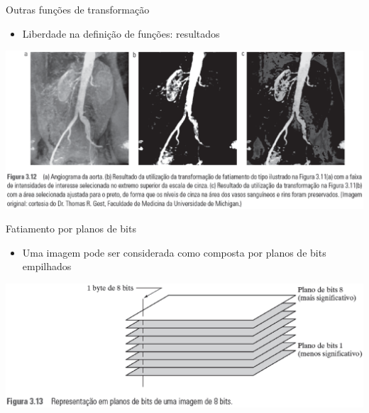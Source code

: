    \begin{slide}[toc=]{Outras funções de transformação}
      \begin{itemize}
         \item Liberdade na definição de funções: resultados
      \end{itemize}
         \begin{center}
             \includegraphics[width=\textwidth]{figs/fig0312}
         \end{center}
    \end{slide}

   \begin{slide}[toc=]{Fatiamento por planos de bits}
      \begin{itemize}
         \item Uma imagem pode ser considerada como composta por planos de bits empilhados
      \end{itemize}
         \begin{center}
             \includegraphics[width=\textwidth]{figs/fig0313}
         \end{center}
    \end{slide}

